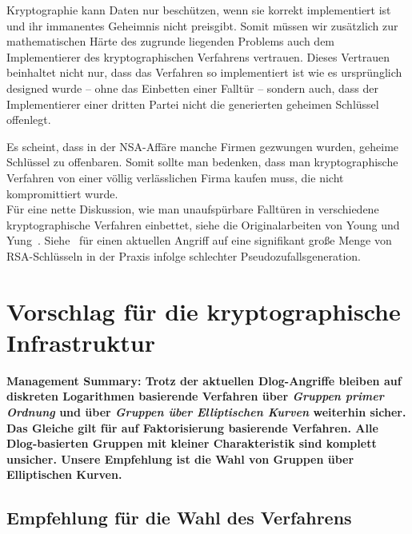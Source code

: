 \begin{refsegment}
 Kryptographie kann Daten nur beschützen, wenn sie korrekt implementiert ist und ihr immanentes Geheimnis nicht preisgibt. Somit müssen wir zusätzlich zur mathematischen Härte des zugrunde liegenden Problems auch dem Implementierer des kryptographischen Verfahrens vertrauen. Dieses Vertrauen beinhaltet nicht nur, dass das Verfahren so implementiert ist wie es ursprünglich designed wurde -- ohne das Einbetten einer Falltür -- sondern auch, dass der Implementierer einer dritten Partei nicht die generierten geheimen Schlüssel offenlegt.

Es scheint, dass in der NSA-Affäre manche Firmen gezwungen wurden, geheime Schlüssel zu offenbaren. Somit sollte man bedenken, dass man kryptographische Verfahren von einer völlig verlässlichen Firma kaufen muss, die nicht kompromittiert wurde.\\

Für eine nette Diskussion, wie man unaufspürbare Falltüren in verschiedene kryptographische Verfahren einbettet, siehe die Originalarbeiten von Young und Yung~\cite{YY1996,YY1997}. Siehe~\cite{keys2012} für einen aktuellen Angriff auf eine signifikant große Menge von RSA-Schlüsseln in der Praxis infolge schlechter Pseudozufallsgeneration.



\newpage
\section{Vorschlag für die kryptographische Infrastruktur}
\label{advice}

{\bf Management Summary: Trotz der aktuellen Dlog-Angriffe bleiben auf diskreten Logarithmen basierende Verfahren über {\em Gruppen primer Ordnung} und über {\em Gruppen über Elliptischen Kurven} weiterhin sicher. Das Gleiche gilt für auf Faktorisierung basierende Verfahren. Alle Dlog-basierten Gruppen mit kleiner Charakteristik sind komplett unsicher. Unsere Empfehlung ist die Wahl von Gruppen über Elliptischen Kurven.}


\subsection{Empfehlung für die Wahl des Verfahrens}


\end{refsegment}
